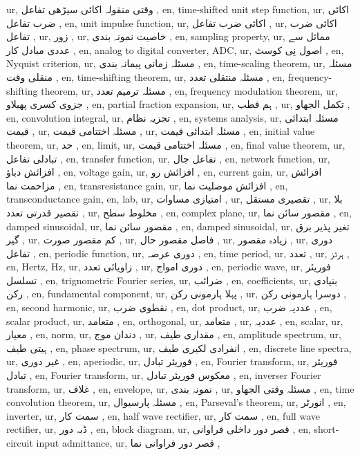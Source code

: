 ur, وقتی منقولہ اکائی سیڑھی تفاعل ,
en, time-shifted unit step function,
ur, اکائی ضرب تفاعل ,
en, unit impulse function,
ur, اکائی ضرب تفاعل ,
ur, اکائی ضرب تفاعل ,
ur, زور ,
ur, خاصیت نمونہ بندی ,
en, sampling property,
ur, مماثل سے عددی مبادل کار ,
en, analog to digital converter, ADC,
ur, اصول نِی کوسٹ ,
en, Nyquist criterion,
ur, مسئلہ زمانی پیمانہ بندی ,
en, time-scaling theorem,
ur, مسئلہ منقلی وقت ,
en, time-shifting theorem,
ur, مسئلہ منتقلی تعدد ,
en, frequency-shifting theorem,
ur, مسئلہ ترمیم تعدد ,
en, frequency modulation theorem,
ur, جزوی کسری پھیلاو ,
en, partial fraction expansion,
ur, ہم قطب ,
ur, تکمل الجھاو ,
en, convolution integral,
ur, تجزیہ نظام ,
en, systems analysis,
ur, مسئلہ ابتدائی قیمت ,
ur, مسئلہ اختتامی قیمت ,
ur, مسئلہ ابتدائی قیمت ,
en, initial value theorem,
ur, حد ,
en, limit,
ur, مسئلہ اختتامی قیمت ,
en, final value theorem,
ur, تبادلی تفاعل ,
en, transfer function,
ur, تفاعل جال ,
en, network function,
ur, افزائش دباؤ ,
en, voltage gain,
ur, افزائش رو ,
en, current gain,
ur, افزائش مزاحمت نما ,
en, transresistance gain,
ur, افزائش موصلیت نما ,
en, transconductance gain,
en, lab,
ur, امتیازی مساوات ,
ur, تقصیری مستقل ,
ur, بلا تقصیر قدرتی تعدد ,
ur, مخلوط سطح ,
en, complex plane,
ur, مقصور سائن نما ,
en, damped sinusoidal,
ur, مقصور سائن نما ,
en, damped sinusoidal,
ur, تغیر پذیر برق گیر ,
ur, کم مقصور صورت ,
ur, فاصل مقصور حال ,
ur, زیادہ مقصور ,
ur, دوری تفاعل ,
en, periodic function,
ur, دوری عرصہ ,
en, time period,
ur, تعدد ,
ur, ہرٹز ,
en, Hertz, \si {\hertz },
ur, زاویائی تعدد ,
ur, دوری امواج ,
en, periodic wave,
ur, فوریئر تسلسل ,
en, trignometric Fourier series,
ur,  ضرائب  ,
en, coefficients,
ur, بنیادی رکن ,
en, fundamental component,
ur, پہلا ہارمونی رکن ,
ur, دوسرا ہارمونی رکن ,
en, second harmonic,
ur, نقطوی ضرب ,
en, dot product,
ur, عددیہ ضرب ,
en, scalar product,
ur, متعامد ,
en, orthogonal,
ur, متعامد ,
ur, عددیہ ,
en, scalar,
ur, معیار ,
en, norm,
ur, دندان موج ,
ur, مقداری طیف ,
en, amplitude spectrum,
ur, ہیتی طیف ,
en, phase spectrum,
ur, انفرادی لکیری طیف ,
en, discrete line spectra,
ur, غیر دوری ,
en, aperiodic,
ur, فوریئر تبادل ,
en, Fourier transform,
ur, فوریئر تبادل ,
en, Fourier transform,
ur, معکوس فوریئر تبادل ,
en, inverser Fourier transform,
ur, غلاف ,
en, envelope,
ur, نمونہ بندی ,
ur, مسئلہ وقتی الجھاو ,
en, time convolution theorem,
ur, مسئلہ پارسیوال ,
en, Parseval's theorem,
ur, انورٹر ,
en, inverter,
ur, سمت کار ,
en, half wave rectifier,
ur, سمت کار ,
en, full wave rectifier,
ur, ڈبہ دور ,
en, block diagram,
ur, قصر دور داخلی فراوانی ,
en, short-circuit input admittance,
ur, قصر دور فراوانی نما ,
